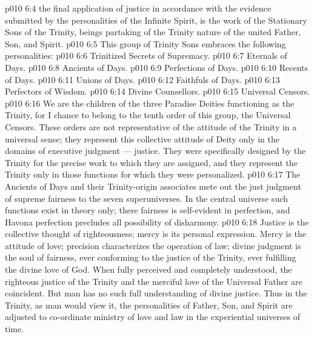 \vs p010 6:4 \pc {} the final application of justice in accordance with the evidence submitted by the personalities of the Infinite Spirit, is the work of the Stationary Sons of the Trinity, beings partaking of the Trinity nature of the united Father, Son, and Spirit.
\vs p010 6:5 \pc This group of Trinity Sons embraces the following personalities:
\vs p010 6:6 \bibnobreakspace Trinitized Secrets of Supremacy.
\vs p010 6:7 \bibnobreakspace Eternals of Days.
\vs p010 6:8 \bibnobreakspace Ancients of Days.
\vs p010 6:9 \bibnobreakspace Perfections of Days.
\vs p010 6:10 \bibnobreakspace Recents of Days.
\vs p010 6:11 \bibnobreakspace Unions of Days.
\vs p010 6:12 \bibnobreakspace Faithfuls of Days.
\vs p010 6:13 \bibnobreakspace Perfectors of Wisdom.
\vs p010 6:14 \bibnobreakspace Divine Counsellors.
\vs p010 6:15 \bibnobreakspace Universal Censors.
\vs p010 6:16 \pc We are the children of the three Paradise Deities functioning as the Trinity, for I chance to belong to the tenth order of this group, the Universal Censors. These orders are not representative of the attitude of the Trinity in a universal sense; they represent this collective attitude of Deity only in the domains of executive judgment --- justice. They were specifically designed by the Trinity for the precise work to which they are assigned, and they represent the Trinity only in those functions for which they were personalized.
\vs p010 6:17 The Ancients of Days and their Trinity\hyp{}origin associates mete out the just judgment of supreme fairness to the seven superuniverses. In the central universe such functions exist in theory only; there fairness is self\hyp{}evident in perfection, and Havona perfection precludes all possibility of disharmony.
\vs p010 6:18 Justice is the collective thought of righteousness; mercy is its personal expression. Mercy is the attitude of love; precision characterizes the operation of law; divine judgment is the soul of fairness, ever conforming to the justice of the Trinity, ever fulfilling the divine love of God. When fully perceived and completely understood, the righteous justice of the Trinity and the merciful love of the Universal Father are coincident. But man has no such full understanding of divine justice. Thus in the Trinity, as man would view it, the personalities of Father, Son, and Spirit are adjusted to co\hyp{}ordinate ministry of love and law in the experiential universes of time.
